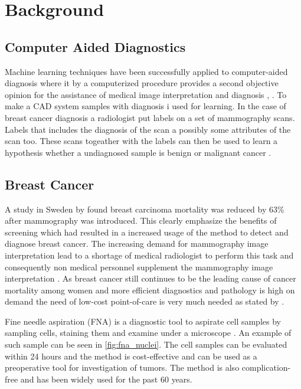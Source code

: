 \chapter{Background}


\section{Computer Aided Diagnostics}

Machine learning techniques have been successfully applied to computer-aided diagnosis where it by a computerized procedure provides a second objective opinion for the assistance of medical image interpretation and diagnosis \parencite{li2007}, \parencite{ni2016}. To make a CAD system samples with diagnosis i used for learning. In the case of breast cancer diagnosis a radiologist put labels on a set of mammography scans. Labels that includes the diagnosis of the scan a possibly some attributes of the scan too. These scans togeather with the labels can then be used to learn a hypothesis whether a undiagnosed sample is benign or malignant cancer \parencite{li2007}.


\section{Breast Cancer} %

A study in Sweden by \textcite{tabar2001} found breast carcinoma mortality was reduced by 63\% after mammography was introduced. This clearly emphasize the benefits of screening which had resulted in a increased usage of the method to detect and diagnose breast cancer. The increasing demand for mammography image interpretation lead to a shortage of medical radiologist to perform this task and consequently non medical personnel supplement the mammography image interpretation \parencite{culpan2016}. As breast cancer still continues to be the leading cause of cancer mortality among women and more efficient diagnostics and pathology is high on demand the need of low-cost point-of-care is very much needed as stated by \textcite{martei2018}.

Fine needle aspiration (FNA) is a diagnostic tool to aspirate cell samples by sampling cells, staining them and examine under a microscope \parencite{FNA}. An example of such sample can be seen in \ref{fig:fna_nuclei}. The cell samples can be evaluated within 24 hours and the method is cost-effective and can be used as a preoperative tool for investigation of tumors. The method is also complication-free and has been widely used for the past 60 years.

